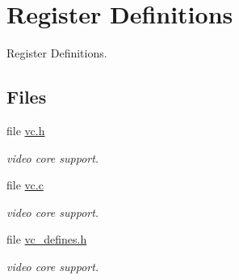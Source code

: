 \hypertarget{group__raspberrypi__vc}{}\section{Register Definitions}
\label{group__raspberrypi__vc}


Register Definitions.  


\subsection*{Files}
\begin{DoxyCompactItemize}
\item 
file \mbox{\hyperlink{vc_8h}{vc.\+h}}
\begin{DoxyCompactList}\small\item\em video core support. \end{DoxyCompactList}\item 
file \mbox{\hyperlink{vc_8c}{vc.\+c}}
\begin{DoxyCompactList}\small\item\em video core support. \end{DoxyCompactList}\item 
file \mbox{\hyperlink{vc__defines_8h}{vc\+\_\+defines.\+h}}
\begin{DoxyCompactList}\small\item\em video core support. \end{DoxyCompactList}\end{DoxyCompactItemize}
